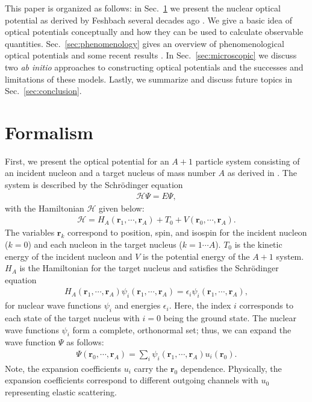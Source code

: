 \documentclass[preprintnumbers,floatfix,aps,prc,preprint,nofootinbib]{revtex4-1}
\begin{document}
This paper is organized as follows: in Sec.~\ref{sec:formalism} we present the nuclear optical potential as derived by Feshbach several decades ago \cite{Feshbach:1958nx, Feshbach:1962ut}. We give a basic idea of optical potentials conceptually and how they can be used to calculate observable quantities. Sec.~\ref{sec:phenomenology} gives an overview of phenomenological optical potentials and some recent results \cite{Koning:2003zz}. In Sec.~\ref{sec:microscopic} we discuss two \textit{ab initio} approaches to constructing optical potentials and the successes and limitations of these models. Lastly, we summarize and discuss future topics in Sec.~\ref{sec:conclusion}.


\section{Formalism}
\label{sec:formalism}


First, we present the optical potential for an $A+1$ particle system consisting of an incident nucleon and a target nucleus of mass number $A$ as derived in \cite{Feshbach:1958nx}. The system is described by the Schr\"odinger equation
%
\begin{eqnarray}
	\label{eq:schrodinger_equation}
	\mathcal{H} \Psi = E \Psi,
\end{eqnarray}
%
with the Hamiltonian $\mathcal{H}$ given below:
%
\begin{eqnarray}
	\label{eq:total_hamiltonian}
	\mathcal{H} = H_A(\textbf{r}_1, \cdots , \textbf{r}_A) + T_0 + V(\textbf{r}_0, \cdots , \textbf{r}_A).
\end{eqnarray}
%
The variables $\textbf{r}_k$ correspond to position, spin, and isospin for the incident nucleon ($k=0$) and each nucleon in the target nucleus ($k=1 \cdots A$). $T_0$ is the kinetic energy of the incident nucleon and $V$ is the potential energy of the $A+1$ system. $H_A$ is the Hamiltonian for the target nucleus and satisfies the Schr\"odinger equation
%
\begin{eqnarray}
	\label{eq:nuclear_schrodinger_equation}
	H_A(\textbf{r}_1, \cdots , \textbf{r}_A) \psi_i(\textbf{r}_1, \cdots , \textbf{r}_A) = \epsilon_i \psi_i(\textbf{r}_1, \cdots , \textbf{r}_A),
\end{eqnarray}
%
for nuclear wave functions $\psi_i$ and energies $\epsilon_i$. Here, the index $i$ corresponds to each state of the target nucleus with $i=0$ being the ground state. The nuclear wave functions $\psi_i$ form a complete, orthonormal set; thus, we can expand the wave function $\Psi$ as follows:
%
\begin{eqnarray}
	\label{eq:wave_function}
	\Psi(\textbf{r}_0, \cdots , \textbf{r}_A) = \sum_{i} \psi_i(\textbf{r}_1, \cdots , \textbf{r}_A) u_i(\textbf{r}_0).
\end{eqnarray}
%
Note, the expansion coefficients $u_i$ carry the $\textbf{r}_0$ dependence. Physically, the expansion coefficients correspond to different outgoing channels with $u_0$ representing elastic scattering.
\\
\end{document}
